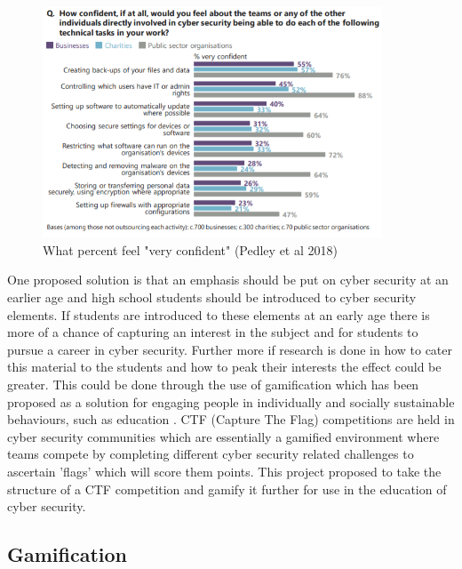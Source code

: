 \documentclass[12pt,a4paper]{article}
\begin{document}
\begin{figure}[h]
    \centering
    \includegraphics[width=0.9\textwidth]{Figs/veryconfidentskillsgap.PNG} 
    \caption{What percent feel "very confident" (Pedley et al 2018)}
    \label{veryconfident}
\end{figure}

One proposed solution is that an emphasis should be put on cyber security at an earlier age and high school students should be introduced to cyber security elements. If students are introduced to these elements at an early age there is more of a chance of capturing an interest in the subject and for students to pursue a career in cyber security. Further more if research is done in how to cater this material to the students and how to peak their interests the effect could be greater. This could be done through the use of gamification which has been proposed as a solution for engaging people in individually and socially sustainable behaviours, such as education \cite{su2015mobile}. CTF (Capture The Flag) competitions are held in cyber security communities which are essentially a gamified environment where teams compete by completing different cyber security related challenges to ascertain 'flags' which will score them points. This project proposed to take the structure of a CTF competition and gamify it further for use in the education of cyber security.   

\subsection{Gamification}
\end{document}
